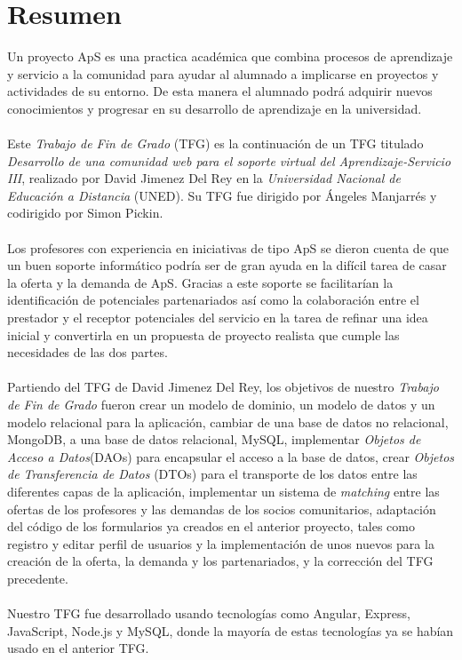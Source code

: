 \documentclass[11pt]{book}
\begin{document}



\tableofcontents
\newpage
\listoffigures
\chapter*{Resumen} 
Un proyecto ApS es una practica académica que combina procesos de aprendizaje y servicio a la comunidad para ayudar al alumnado a implicarse en proyectos y actividades de su entorno. De esta manera el alumnado podrá adquirir nuevos conocimientos y progresar en su desarrollo de aprendizaje en la universidad.\\\\
Este \textit{Trabajo de Fin de Grado} (TFG) es la continuación de un TFG titulado \textit{Desarrollo de una comunidad web para el soporte virtual del Aprendizaje-Servicio III}, realizado por David Jimenez Del Rey en la \emph{Universidad Nacional de Educación a Distancia} (UNED). Su TFG fue dirigido por Ángeles Manjarrés y codirigido por Simon Pickin. \\\\
Los profesores con experiencia en iniciativas de tipo ApS se dieron cuenta de que un buen soporte informático podría ser de gran ayuda en la difícil tarea de casar la oferta y la demanda de ApS. Gracias a este soporte se facilitarían la identificación de potenciales partenariados así como la colaboración entre el prestador y el receptor potenciales del servicio en la tarea de refinar una idea inicial y convertirla en un propuesta de proyecto realista que cumple las necesidades de las dos partes.\\\\ 
Partiendo del TFG de David Jimenez Del Rey, los objetivos de nuestro \textit{Trabajo de Fin de Grado} fueron crear un modelo de dominio, un modelo de datos y un modelo relacional para la aplicación, cambiar de una base de datos no relacional, MongoDB, a una base de datos relacional, MySQL, implementar \emph{Objetos de Acceso a Datos}(DAOs) para encapsular el acceso a la base de datos, crear \emph{Objetos de Transferencia de Datos} (DTOs) para el transporte de los datos entre las diferentes capas de la aplicación, implementar un sistema de \textit{matching} entre las ofertas de los profesores y las demandas de los socios comunitarios, adaptación del código de los formularios ya creados en el anterior proyecto, tales como registro  y editar perfil de usuarios y la implementación de unos nuevos para la creación  de la oferta, la demanda y los partenariados, y la corrección del TFG precedente.\\\\
Nuestro TFG fue desarrollado usando tecnologías como Angular, Express, JavaScript, Node.js y MySQL, donde la mayoría de estas tecnologías ya se habían usado en el anterior TFG.\\\\
\end{document}
